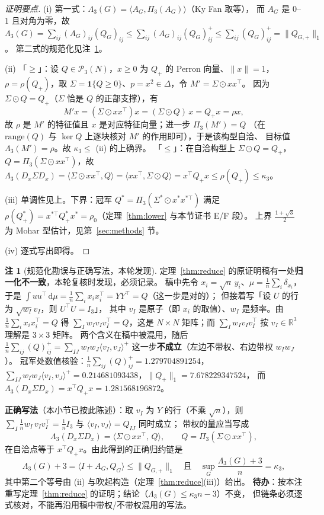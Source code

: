 \documentclass[UTF8,11pt]{ctexart}
\theoremstyle{definition}
\newtheorem{remark}[theorem]{注}
\newcommand{\Lam}{\Lambda}
\newcommand{\dd}{\,\mathrm{d}}
\newcommand{\R}{\mathbb{R}}
\begin{document}
\begin{proof}[证明要点]
(i) 第一式：$\Lam_3(G)=\langle A_G,\Pi_3(A_G)\rangle$（Ky Fan 取等），
而 $A_G$ 是 $0$--$1$ 且对角为零，故
$\Lam_3(G)=\sum_{ij}(A_G)_{ij}(Q_G)_{ij}\le\sum_{ij}(A_G)_{ij}(Q_G)^+_{ij}
\le\sum_{ij}(Q_G)^+_{ij}=\|Q_{G,+}\|_1$。
第二式的规范化见注~\ref{rmk:normcaution}。

(ii) 「$\ge$」：设 $Q\in\mathcal P_3(N)$，$x\ge0$ 为 $Q_+$ 的 Perron 向量、$\|x\|=1$，
$\rho=\rho(Q_+)$，取 $\Sigma=\mathbf 1\{Q\ge0\}$、$p=x^2\in\Delta$，令 $M'=\Sigma\odot xx^\top$。
因为 $\Sigma\odot Q=Q_+$（$\Sigma$ 恰是 $Q$ 的正部支撑），有
\[
M'x=(\Sigma\odot xx^\top)x=(\Sigma\odot Q)\,x=Q_+x=\rho x,
\]
故 $\rho$ 是 $M'$ 的特征值且 $x$ 是对应特征向量；进一步 $\Pi_3(M')=Q$
（在 $\mathrm{range}(Q)$ 与 $\ker Q$ 上逐块核对 $M'$ 的作用即可），于是该构型自洽、
目标值 $\Lam_3(M')=\rho$。故 $\kappa_3\le$ (ii) 的上确界。
「$\le$」：在自洽构型上 $\Sigma\odot Q=Q_+$，$Q=\Pi_3(\Sigma\odot xx^\top)$，故
$\Lam_3(D_x\Sigma D_x)=\langle\Sigma\odot xx^\top,Q\rangle
=\langle xx^\top,\Sigma\odot Q\rangle=x^\top Q_+x\le\rho(Q_+)\le\kappa_3$。

(iii) 单调性见上。下界：冠军 $Q^\ast=\Pi_3(\Sigma^\ast\odot x^\ast x^{\ast\top})$
满足 $\rho(Q^\ast_+)=x^{\ast\top}Q^\ast_+x^\ast=\rho_0$（定理~\ref{thm:lower} 与本节证书 E/F 段）。
上界 $\frac{1+\sqrt3}{2}$ 为 Mohar 型估计，见第~\ref{sec:methods} 节。

(iv) 逐式写出即得。\qedhere
\end{proof}

\begin{remark}[规范化勘误与正确写法，本轮发现]\label{rmk:normcaution}
定理~\ref{thm:reduce} 的原证明稿有一处\textbf{归一化不一致}，本轮复核时发现，必须记录。
稿中先令 $x_i=\sqrt n\,y_i$、$\mu=\frac1n\sum_i\delta_{x_i}$，于是
$\int uu^\top\dd\mu=\frac1n\sum_ix_i x_i^\top=YY^\top=Q$（这一步是对的）；
但接着写「设 $U$ 的行为 $\sqrt{w_I}v_I$，则 $U^\top U=I_3$」，
其中 $v_I$ 是原子（即 $x_i$ 的取值）、$w_I$ 是频率。由 $\frac1n\sum_ix_ix_i^\top=Q$ 得
$\sum_Iw_Iv_Iv_I^\top=Q$，这是 $N\times N$ 矩阵；而 $\sum_Iw_Iv_Iv_I^\top$ 按 $v_I\in\R^3$ 理解是 $3\times3$ 矩阵。
两个含义在稿中被混用，随后 $\frac1n\sum_{ij}(Q)_{ij}^{+}=\sum_{IJ}w_Iw_J\langle v_I,v_J\rangle^{+}$
这一步\textbf{不成立}（左边不带权、右边带权 $w_Iw_J$）。
冠军处数值核验：$\frac1n\sum_{ij}(Q)_{ij}^+=1.279704891254$，
$\sum_{IJ}w_Iw_J\langle v_I,v_J\rangle^+=0.214681093438$，$\|Q_+\|_1=7.678229347524$，
而 $\Lam_3(D_x\Sigma D_x)=x^\top Q_+x=1.281568196872$。

\textbf{正确写法}（本小节已按此陈述）：取 $v_I$ 为 $Y$ 的行（不乘 $\sqrt n$），则
$\sum_I\frac1nw_I\,v_Iv_I^\top=\frac1nI_3$ 与 $\langle v_I,v_J\rangle=Q_{IJ}$ 同时成立；
带权的量应当写成
\[
\Lam_3(D_x\Sigma D_x)=\langle\Sigma\odot xx^\top,\,Q\rangle,\qquad Q=\Pi_3(\Sigma\odot xx^\top),
\]
在自洽点等于 $x^\top Q_+x$。由此得到的正确归约链是
\[
\Lam_3(G)+3=\langle I+A_G,Q_G\rangle\le\|Q_{G,+}\|_1
\quad\text{且}\quad
\sup_G\frac{\Lam_3(G)+3}{n}=\kappa_3 ,
\]
其中第二个等号由 (ii) 与吹起构造（定理~\ref{thm:reduce}(iii)）给出。
\textbf{待办}：按本注重写定理~\ref{thm:reduce} 的证明；结论（$\Lam_3(G)\le\kappa_3n-3$）不变，
但链条必须逐式核对，不能再沿用稿中带权/不带权混用的写法。
\end{remark}
\end{document}
